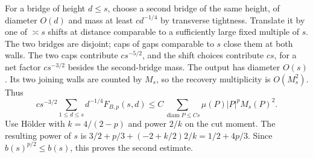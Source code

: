 \documentclass[11pt]{article}
\numberwithin{equation}{section}
\theoremstyle{definition}\newtheorem{definition}[theorem]{Definition}
\theoremstyle{remark}\newtheorem{remark}[theorem]{Remark}
\begin{document}
For a bridge of height $d\le s$, choose a second bridge of the same
height, of diameter $O(d)$ and mass at least $cd^{-1/4}$ by transverse
tightness.  Translate it by one of $\asymp s$ shifts at distance
comparable to a sufficiently large fixed multiple of $s$.  The two
bridges are disjoint; caps of gaps comparable to $s$ close them at
both walls.  The two caps contribute $cs^{-5/2}$, and the shift
choices contribute $cs$, for a net factor $cs^{-3/2}$ besides the
second-bridge mass.  The output has diameter $O(s)$.  Its two joining
walls are counted by $M_s$, so the recovery multiplicity is
$O(M_s^2)$.  Thus
\[
 c s^{-3/2}\sum_{1\le d\le s}d^{-1/4}F_{B,p}(s,d)
 \le C\sum_{\operatorname{diam}P\le Cs}\mu(P)|P|^pM_s(P)^2.
\]
Use H\"older with $k=4/(2-p)$ and power $2/k$ on the cut moment.
The resulting power of $s$ is
$3/2+p/3+(-2+k/2)2/k=1/2+4p/3$.
Since $b(s)^{p/2}\le b(s)$, this proves the second estimate.
\end{document}
